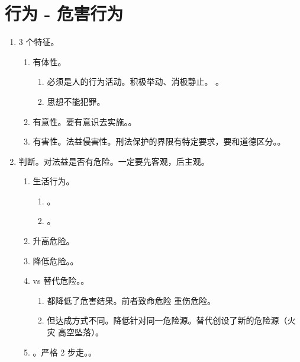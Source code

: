 \section{行为 - 危害行为}
\begin{enumerate}
  \item 3 个特征。
        \begin{enumerate}
          \item 有体性。
                \begin{enumerate}
                  \item 必须是人的行为活动。积极举动、消极静止。
                        。
                  \item 思想不能犯罪。
                \end{enumerate}
          \item 有意性。要有意识去实施。。
          \item 有害性。法益侵害性。刑法保护的界限有特定要求，要和道德区分。。
        \end{enumerate}
  \item 判断。对法益是否有危险。一定要先客观，后主观。
        \begin{enumerate}
          \item 生活行为。
                \begin{enumerate}
                  \item {}。
                  \item {}。
                \end{enumerate}
          \item 升高危险。
          \item 降低危险。。
          \item vs 替代危险。。
                \begin{enumerate}
                  \item 都降低了危害结果。前者致命危险 \yjt 重伤危险。
                  \item 但达成方式不同。降低针对同一危险源。替代创设了新的危险源（火灾 \yjt 高空坠落）。
                \end{enumerate}
          \item {}。严格 2 步走。。
                \begin{enumerate}

\end{enumerate}
\end{enumerate}
\end{enumerate}
